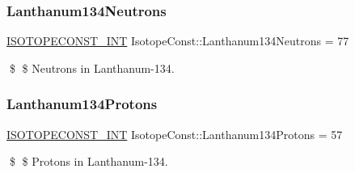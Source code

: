 \subsubsection{\texorpdfstring{Lanthanum134\+Neutrons}{Lanthanum134Neutrons}}
{\footnotesize\ttfamily \mbox{\hyperlink{group___isotope_const-_macros_ga5f18360b3e99483a35c32d789e62621c}{I\+S\+O\+T\+O\+P\+E\+C\+O\+N\+S\+T\+\_\+\+I\+NT}} Isotope\+Const\+::\+Lanthanum134\+Neutrons = 77}

\$ \$ Neutrons in Lanthanum-\/134. \mbox{\label{group___isotope_const-_lanthanum-_la134_ga505c5a4198545f08117048acc4a21023}} 
\subsubsection{\texorpdfstring{Lanthanum134\+Protons}{Lanthanum134Protons}}
{\footnotesize\ttfamily \mbox{\hyperlink{group___isotope_const-_macros_ga5f18360b3e99483a35c32d789e62621c}{I\+S\+O\+T\+O\+P\+E\+C\+O\+N\+S\+T\+\_\+\+I\+NT}} Isotope\+Const\+::\+Lanthanum134\+Protons = 57}

\$ \$ Protons in Lanthanum-\/134. 
